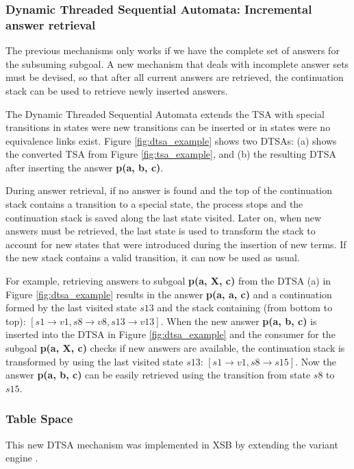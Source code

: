   \subsubsection{Dynamic Threaded Sequential Automata: Incremental answer retrieval}
  
  The previous mechanisms only works if we have the complete set of answers for the subsuming subgoal.
  A new mechanism that deals with incomplete answer sets must be devised, so that after all current answers
  are retrieved, the continuation stack can be used to retrieve newly inserted answers.
  
  The Dynamic Threaded Sequential Automata extends the TSA with special transitions in states
  were new transitions can be inserted or in states were no equivalence links exist.
  Figure \ref{fig:dtsa_example} shows two DTSAs: (a) shows the converted TSA from Figure \ref{fig:tsa_example}, and
  (b) the resulting DTSA after inserting the answer \textbf{p(a, b, c)}.
  
  During answer retrieval, if no answer is found and the top of the continuation stack contains
  a transition to a special state, the process stops and the continuation stack is saved along the last state
  visited.
  Later on, when new answers must be retrieved, the last state is used to transform the stack to account for new states that
  were introduced during the insertion of new terms. If the new stack contains a valid transition, it
  can now be used as usual.
  
  For example, retrieving answers to subgoal \textbf{p(a, X, c)} from the DTSA (a) in Figure
  \ref{fig:dtsa_example} results in the answer \textbf{p(a, a, c)} and a continuation formed by the last
  visited state $s13$ and the stack containing (from bottom to top): $[s1 \rightarrow v1, s8 \rightarrow v8, s13 \rightarrow v13]$.
  When the new answer \textbf{p(a, b, c)} is inserted into the DTSA in Figure \ref{fig:dtsa_example} and
  the consumer for the subgoal \textbf{p(a, X, c)} checks if new answers are available, the continuation stack
  is transformed by using the last visited state $s13$: $[s1 \rightarrow v1, s8 \rightarrow s15]$. Now
  the answer \textbf{p(a, b, c)} can be easily retrieved using the transition from state $s8$ to $s15$.
  
  \subsubsection{Table Space}
  
  This new DTSA mechanism was implemented in XSB by extending the variant engine \cite{Rao-96}.
  
